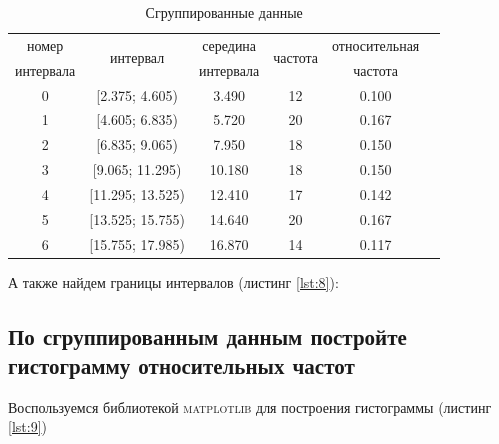 \documentclass[a4paper, 14pt]{extarticle}
\begin{document}
\begin{table}[h!]
    \centering
    \renewcommand{\arraystretch}{1.5}
    \begin{adjustbox}{max width=0.8\textwidth}
        \begin{tabular}{|c|c|c|c|c|c|}
        \hline
        номер & \multirow{2}{*}{интервал} & середина & \multirow{2}{*}{частота} & относительная \\
        интервала & & интервала & & частота \\
        \hline
        0 & [2.375; 4.605) & 3.490 & 12 & 0.100 \\
        \hline
        1 & [4.605; 6.835) & 5.720 & 20 & 0.167 \\
        \hline
        2 & [6.835; 9.065) & 7.950 & 18 & 0.150 \\
        \hline
        3 & [9.065; 11.295) & 10.180 & 18 & 0.150 \\
        \hline
        4 & [11.295; 13.525) & 12.410 & 17 & 0.142 \\
        \hline
        5 & [13.525; 15.755) & 14.640 & 20 & 0.167 \\
        \hline
        6 & [15.755; 17.985) & 16.870 & 14 & 0.117 \\
        \hline
        \end{tabular}
    \end{adjustbox}
    \caption{Сгруппированные данные}
    \label{tab:your_table_label}
\end{table}

А также найдем границы интервалов (листинг \ref{lst:8}):
\begin{equation*}
    [ 2.375 \hspace{10pt}  4.605 \hspace{10pt}  6.835 \hspace{10pt}  9.065 \hspace{10pt} 11.295 \hspace{10pt} 13.525 \hspace{10pt} 15.755 \hspace{10pt} 17.985]
\end{equation*}

\subsection{По сгруппированным данным постройте гистограмму относительных частот}

Воспользуемся библиотекой \textsc{matplotlib} для построения гистограммы (листинг \ref{lst:9})
\end{document}
